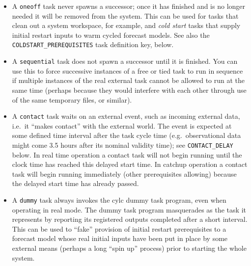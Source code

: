 \documentclass[11pt,a4paper]{article}
\begin{document}
\begin{itemize}
    \item A \lstinline=oneoff= task never spawns a successor; once it
        has finished and is no longer needed it will be removed from the
        system. This can be used for tasks that clean out a system 
        workspace, for example, and {\em cold start} tasks that supply
        initial restart inputs to warm cycled forecast models. See also
        the \lstinline=COLDSTART_PREREQUISITES= task definition key, below.

    \item A \lstinline=sequential= task does not spawn a successor until it is
        finished. You can use this to force successive instances of a
        free or tied task to run in sequence if multiple instances of
        the real external task cannot be allowed to run at the same
        time (perhaps because they would interfere with each other
        through use of the same temporary files, or similar).

    \item A \lstinline=contact= task waits on an external event, such as
        incoming external data, i.e.\ it ``makes contact'' with the
        external world.  The event is expected at some defined time
        interval after the task cycle time (e.g.\ observational data
        might come 3.5 hours after its nominal validity time); see
        \lstinline=CONTACT_DELAY= below. In real time operation a contact task will
        not begin running until the clock time has reached this delayed
        start time. In catchup operation a contact task will begin
        running immediately (other prerequisites allowing) because the
        delayed start time has already passed.  
        


    \item A \lstinline=dummy= task always invokes the cylc dummy task
        program, even when operating in real mode.  The dummy task
        program masquerades as the task it represents by reporting its
        registered outputs completed after a short interval. This can be
        used to ``fake'' provision of initial restart prerequisites to a
        forecast model whose real initial inputs have been put in place
        by some external means (perhaps a long ``spin up'' process)
        prior to starting the whole system.

\end{itemize}
\end{document}
